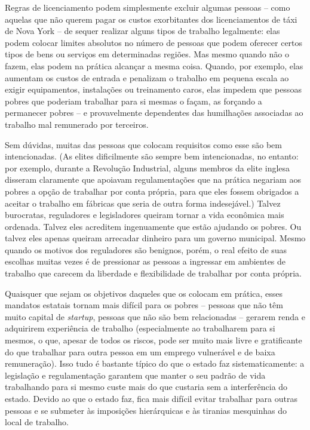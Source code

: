 Regras de licenciamento podem simplesmente excluir algumas pessoas -- como aquelas que não querem pagar os custos exorbitantes dos licenciamentos de táxi de Nova York -- de sequer realizar alguns tipos de trabalho legalmente: elas podem colocar limites absolutos no número de pessoas que podem oferecer certos tipos de bens ou serviços em determinadas regiões. Mas mesmo quando não o fazem, elas podem na prática alcançar a mesma coisa. Quando, por exemplo, elas aumentam os custos de entrada e penalizam o trabalho em pequena escala ao exigir equipamentos, instalações ou treinamento caros, elas impedem que pessoas pobres que poderiam trabalhar para si mesmas o façam, as forçando a permanecer pobres -- e provavelmente dependentes das humilhações associadas ao trabalho mal remunerado por terceiros.

Sem dúvidas, muitas das pessoas que colocam requisitos como esse são bem intencionadas. (As elites dificilmente são sempre bem intencionadas, no entanto: por exemplo, durante a Revolução Industrial, alguns membros da elite inglesa disseram claramente que apoiavam regulamentações que na prática negariam aos pobres a opção de trabalhar por conta própria, para que eles fossem obrigados a aceitar o trabalho em fábricas que seria de outra forma indesejável.) Talvez burocratas, reguladores e legisladores queiram tornar a vida econômica mais ordenada. Talvez eles acreditem ingenuamente que estão ajudando os pobres. Ou talvez eles apenas queiram arrecadar dinheiro para um governo municipal. Mesmo quando os motivos dos reguladores são benignos, porém, o real efeito de suas escolhas muitas vezes é de pressionar as pessoas a ingressar em ambientes de trabalho que carecem da liberdade e flexibilidade de trabalhar por conta própria.

Quaisquer que sejam os objetivos daqueles que os colocam em prática, esses mandatos estatais tornam mais difícil para os pobres -- pessoas que não têm muito capital de \emph{startup}, pessoas que não são bem relacionadas -- gerarem renda e adquirirem experiência de trabalho (especialmente ao trabalharem para si mesmos, o que, apesar de todos os riscos, pode ser muito mais livre e gratificante do que trabalhar para outra pessoa em um emprego vulnerável e de baixa remuneração). Isso tudo é bastante típico do que o estado faz sistematicamente: a legislação e regulamentação garantem que manter o seu padrão de vida trabalhando para si mesmo custe mais do que custaria sem a interferência do estado. Devido ao que o estado faz, fica mais difícil evitar trabalhar para outras pessoas e se submeter às imposições hierárquicas e às tiranias mesquinhas do local de trabalho.

